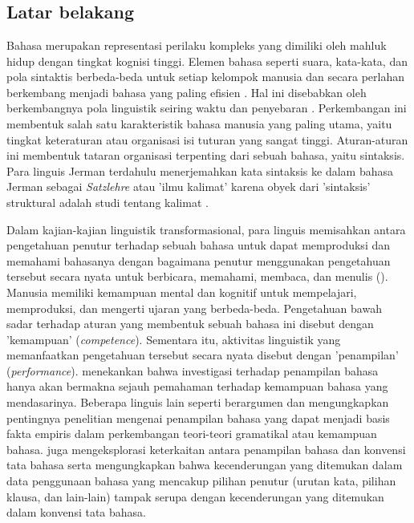                 
\onehalfspacing
\chapter{\babSatu}

\section{Latar belakang}
Bahasa merupakan representasi perilaku kompleks yang dimiliki oleh mahluk hidup dengan tingkat kognisi tinggi. Elemen bahasa seperti suara, kata-kata, dan pola sintaktis berbeda-beda untuk setiap kelompok manusia dan secara perlahan berkembang menjadi bahasa yang paling efisien \citep[p. 6]{aitchison2004change}. Hal ini disebabkan oleh berkembangnya pola linguistik seiring waktu dan penyebaran \citep{sapir1921intro}. Perkembangan ini membentuk salah satu karakteristik bahasa manusia yang paling utama, yaitu tingkat keteraturan atau organisasi isi tuturan yang sangat tinggi. Aturan-aturan ini membentuk tataran organisasi terpenting dari sebuah bahasa, yaitu sintaksis. Para linguis Jerman terdahulu menerjemahkan kata sintaksis ke dalam bahasa Jerman sebagai \textit{Satzlehre} atau 'ilmu kalimat' karena obyek dari 'sintaksis' struktural adalah studi tentang kalimat \citep{tesniere1959elements}.

Dalam kajian-kajian linguistik transformasional, para linguis memisahkan antara pengetahuan penutur terhadap sebuah bahasa untuk dapat memproduksi dan memahami bahasanya dengan bagaimana penutur menggunakan pengetahuan tersebut secara nyata untuk berbicara, memahami, membaca, dan menulis (\citealp{chomsky1965syntactic, delahuntygarvey2010soundsense}). Manusia memiliki kemampuan mental dan kognitif untuk mempelajari, memproduksi, dan mengerti ujaran yang berbeda-beda. Pengetahuan bawah sadar terhadap aturan yang membentuk sebuah bahasa ini disebut dengan 'kemampuan' (\textit{competence}). Sementara itu, aktivitas linguistik yang memanfaatkan pengetahuan tersebut secara nyata disebut dengan 'penampilan' (\textit{performance}). \cite{chomsky1965syntactic} menekankan bahwa investigasi terhadap penampilan bahasa hanya akan bermakna sejauh pemahaman terhadap kemampuan bahasa yang mendasarinya. Beberapa linguis lain seperti \cite{sagwasow2011pccg} berargumen dan mengungkapkan pentingnya penelitian mengenai penampilan bahasa yang dapat menjadi basis fakta empiris dalam perkembangan teori-teori gramatikal atau kemampuan bahasa. \cite{hawkins2014cross} juga mengeksplorasi keterkaitan antara penampilan bahasa dan konvensi tata bahasa serta mengungkapkan bahwa kecenderungan yang ditemukan dalam data penggunaan bahasa yang mencakup pilihan penutur (urutan kata, pilihan klausa, dan lain-lain) tampak serupa dengan kecenderungan yang ditemukan dalam konvensi tata bahasa. 


